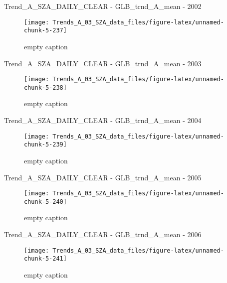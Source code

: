 \documentclass[
  10pt,
  a4paper,oneside]{article}
\begin{document}
Trend\_A\_SZA\_DAILY\_CLEAR - GLB\_trnd\_A\_mean - 2002

\begin{figure}[!ht]

{\centering \texttt{[image: Trends\_A\_03\_SZA\_data\_files/figure-latex/unnamed-chunk-5-237]} 

}

\caption{ empty caption }\label{fig:unnamed-chunk-5-237}
\end{figure}

Trend\_A\_SZA\_DAILY\_CLEAR - GLB\_trnd\_A\_mean - 2003

\begin{figure}[!ht]

{\centering \texttt{[image: Trends\_A\_03\_SZA\_data\_files/figure-latex/unnamed-chunk-5-238]} 

}

\caption{ empty caption }\label{fig:unnamed-chunk-5-238}
\end{figure}

Trend\_A\_SZA\_DAILY\_CLEAR - GLB\_trnd\_A\_mean - 2004

\begin{figure}[!ht]

{\centering \texttt{[image: Trends\_A\_03\_SZA\_data\_files/figure-latex/unnamed-chunk-5-239]} 

}

\caption{ empty caption }\label{fig:unnamed-chunk-5-239}
\end{figure}

Trend\_A\_SZA\_DAILY\_CLEAR - GLB\_trnd\_A\_mean - 2005

\begin{figure}[!ht]

{\centering \texttt{[image: Trends\_A\_03\_SZA\_data\_files/figure-latex/unnamed-chunk-5-240]} 

}

\caption{ empty caption }\label{fig:unnamed-chunk-5-240}
\end{figure}

Trend\_A\_SZA\_DAILY\_CLEAR - GLB\_trnd\_A\_mean - 2006

\begin{figure}[!ht]

{\centering \texttt{[image: Trends\_A\_03\_SZA\_data\_files/figure-latex/unnamed-chunk-5-241]} 

}

\caption{ empty caption }\label{fig:unnamed-chunk-5-241}
\end{figure}
\end{document}
